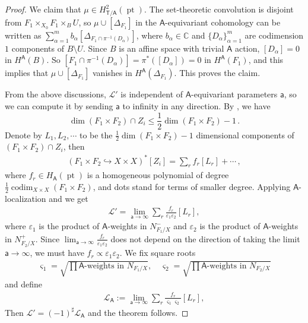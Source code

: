 \documentclass[10pt]{amsart}
\theoremstyle{definition}
\numberwithin{equation}{section}
\newcommand{\bC}{\mathbb{C}}
\newcommand{\sA}{\mathsf{A}}
\newcommand{\sT}{\mathsf{T}}
\newcommand{\codim}{\operatorname{codim}}
\newcommand{\pt}{\operatorname{pt}}
\begin{document}
\begin{proof}
We claim that $\mu\in H^2_{\sT/\sA}(\pt)$. The set-theoretic convolution is disjoint from $F_1\times_{X_0} F_1\times_B U$, so $\mu\cup[\Delta_{F_1}]$ in the $\sA$-equivariant cohomology can be written as $\sum_{\alpha=1}^m b_\alpha [\Delta_{F_1\cap\pi^{-1}(D_\alpha)}]$, where $b_\alpha\in \bC$ and $\{D_\alpha\}_{\alpha=1}^m$ are codimension $1$ components of $B\setminus U$. Since $B$ is an affine space with trivial $\sA$ action, $[D_\alpha]=0$ in $H^\sA(B)$. So $[F_1\cap\pi^{-1}(D_\alpha)]=\pi^*([D_\alpha])=0$ in $H^\sA(F_1)$, and this implies that $\mu\cup[\Delta_{F_1}]$ vanishes in $H^\sA(\Delta_{F_1})$. This proves the claim.

From the above discussions, $\mathcal L'$ is independent of $\sA$-equivariant parameters $\mathsf a$, so we can compute it by sending $\mathsf a$ to infinity in any direction. By \cite[Prop.~3.23]{COZZ3}, we have 
$$\dim (F_1\times F_2)\cap Z_i\leqslant \frac{1}{2}\dim (F_1\times F_2)-1\,.$$
Denote by $L_1,L_2,\cdots$ to be the $\frac{1}{2}\dim (F_1\times F_2)-1$ dimensional components of $(F_1\times F_2)\cap Z_i$, then
\begin{align*}
(F_1\times F_2\hookrightarrow X\times X)^*[Z_i]=\sum_{r} f_r [L_r]+\cdots\,,
\end{align*}
where $f_r\in H_{\sA}(\pt)$ is a homogeneous polynomial of degree $\frac{1}{2}\codim_{X\times X}(F_1\times F_2)$, and dots stand for terms of smaller degree. Applying $\sA$-localization and we get 
\begin{align*}
    \mathcal L'=\lim_{\mathsf a\to \infty}\sum_{r}\frac{f_r}{\varepsilon_1\varepsilon_2}[L_r],
\end{align*}
where $\varepsilon_1$ is the product of $\sA$-weights in $N^{-}_{F_1/X}$ and $\varepsilon_2$ is the product of $\sA$-weights in $N^{+}_{F_2/X}$. Since $\lim_{\mathsf a\to \infty}\frac{f_r}{\varepsilon_1\varepsilon_2}$ does not depend on the direction of taking the limit $\mathsf a\to \infty$, we must have $f_r\propto \varepsilon_1\varepsilon_2$. We fix square roots 
\begin{align*}
    \varsigma_1=\sqrt{\prod\text{$\sA$-weights in $N_{F_1/X}$}},\quad \varsigma_2=\sqrt{\prod\text{$\sA$-weights in $N_{F_2/X}$}}
\end{align*}
and define 
\begin{align*}
    \mathcal L_\sA:=\lim_{\mathsf a\to \infty}\sum_{r}\frac{f_r}{\varsigma_1\varsigma_2}[L_r],
\end{align*}
Then $\mathcal L'=(-1)^\sharp \mathcal L_\sA$ and the theorem follows.
\end{proof}
\end{document}
